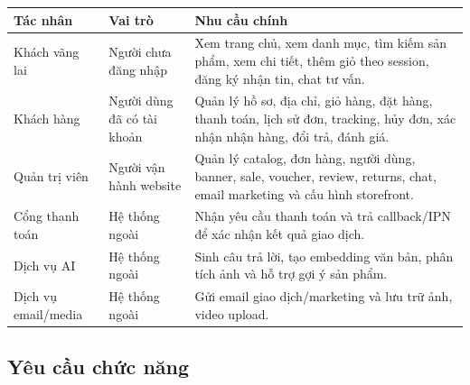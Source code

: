 \documentclass[12pt,a4paper]{report}
\begin{document}
\begin{longtable}{|p{3.2cm}|p{4.2cm}|p{7cm}|}
\hline
\textbf{Tác nhân} & \textbf{Vai trò} & \textbf{Nhu cầu chính} \\
\hline
Khách vãng lai & Người chưa đăng nhập & Xem trang chủ, xem danh mục, tìm kiếm sản phẩm, xem chi tiết, thêm giỏ theo session, đăng ký nhận tin, chat tư vấn. \\
\hline
Khách hàng & Người dùng đã có tài khoản & Quản lý hồ sơ, địa chỉ, giỏ hàng, đặt hàng, thanh toán, lịch sử đơn, tracking, hủy đơn, xác nhận nhận hàng, đổi trả, đánh giá. \\
\hline
Quản trị viên & Người vận hành website & Quản lý catalog, đơn hàng, người dùng, banner, sale, voucher, review, returns, chat, email marketing và cấu hình storefront. \\
\hline
Cổng thanh toán & Hệ thống ngoài & Nhận yêu cầu thanh toán và trả callback/IPN để xác nhận kết quả giao dịch. \\
\hline
Dịch vụ AI & Hệ thống ngoài & Sinh câu trả lời, tạo embedding văn bản, phân tích ảnh và hỗ trợ gợi ý sản phẩm. \\
\hline
Dịch vụ email/media & Hệ thống ngoài & Gửi email giao dịch/marketing và lưu trữ ảnh, video upload. \\
\hline
\end{longtable}

\subsection{Yêu cầu chức năng}
\end{document}
